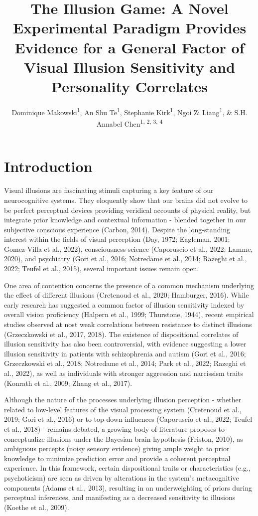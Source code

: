 \documentclass[
  man,floatsintext]{apa6}
\title{\textbf{The Illusion Game: A Novel Experimental Paradigm Provides Evidence for a General Factor of Visual Illusion Sensitivity and Personality Correlates}}
\author{Dominique Makowski\textsuperscript{1}, An Shu Te\textsuperscript{1}, Stephanie Kirk\textsuperscript{1}, Ngoi Zi Liang\textsuperscript{1}, \& S.H. Annabel Chen\textsuperscript{1, 2, 3, 4}}
\date{}
\affiliation{\vspace{0.5cm}\textsuperscript{1} School of Social Sciences, Nanyang Technological University, Singapore\\\textsuperscript{2} LKC Medicine, Nanyang Technological University, Singapore\\\textsuperscript{3} National Institute of Education, Singapore\\\textsuperscript{4} Centre for Research and Development in Learning, Nanyang Technological University, Singapore}
\begin{document}
\maketitle

\hypertarget{introduction}{%
\section{Introduction}\label{introduction}}

Visual illusions are fascinating stimuli capturing a key feature of our neurocognitive systems. They eloquently show that our brains did not evolve to be perfect perceptual devices providing veridical accounts of physical reality, but integrate prior knowledge and contextual information - blended together in our subjective conscious experience (Carbon, 2014). Despite the long-standing interest within the fields of visual perception (Day, 1972; Eagleman, 2001; Gomez-Villa et al., 2022), consciousness science (Caporuscio et al., 2022; Lamme, 2020), and psychiatry (Gori et al., 2016; Notredame et al., 2014; Razeghi et al., 2022; Teufel et al., 2015), several important issues remain open.

One area of contention concerns the presence of a common mechanism underlying the effect of different illusions (Cretenoud et al., 2020; Hamburger, 2016). While early research has suggested a common factor of illusion sensitivity indexed by overall vision proficiency (Halpern et al., 1999; Thurstone, 1944), recent empirical studies observed at nost weak correlations between resistance to distinct illusions (Grzeczkowski et al., 2017, 2018). The existence of dispositional correlates of illusion sensitivity has also been controversial, with evidence suggesting a lower illusion sensitivity in patients with schizophrenia and autism (Gori et al., 2016; Grzeczkowski et al., 2018; Notredame et al., 2014; Park et al., 2022; Razeghi et al., 2022), as well as individuals with stronger aggression and narcissism traits (Konrath et al., 2009; Zhang et al., 2017).

Although the nature of the processes underlying illusion perception - whether related to low-level features of the visual processing system (Cretenoud et al., 2019; Gori et al., 2016) or to top-down influences (Caporuscio et al., 2022; Teufel et al., 2018) - remains debated, a growing body of literature proposes to conceptualize illusions under the Bayesian brain hypothesis (Friston, 2010), as ambiguous percepts (noisy sensory evidence) giving ample weight to prior knowledge to minimize prediction error and provide a coherent perceptual experience. In this framework, certain dispositional traits or characteristics (e.g., psychoticism) are seen as driven by alterations in the system's metacognitive components (Adams et al., 2013), resulting in an underweighting of priors during perceptual inferences, and manifesting as a decreased sensitivity to illusions (Koethe et al., 2009).
\end{document}
